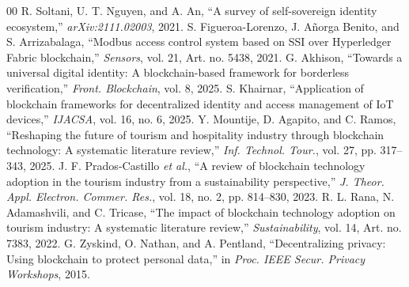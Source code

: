 \documentclass[conference]{IEEEtran}
\begin{document}
\begin{thebibliography}{00}
 R. Soltani, U. T. Nguyen, and A. An, ``A survey of self-sovereign identity ecosystem,'' \textit{arXiv:2111.02003}, 2021.
 S. Figueroa-Lorenzo, J. A\~norga Benito, and S. Arrizabalaga, ``Modbus access control system based on SSI over Hyperledger Fabric blockchain,'' \textit{Sensors}, vol. 21, Art. no. 5438, 2021.
 G. Akhison, ``Towards a universal digital identity: A blockchain-based framework for borderless verification,'' \textit{Front. Blockchain}, vol. 8, 2025.
 S. Khairnar, ``Application of blockchain frameworks for decentralized identity and access management of IoT devices,'' \textit{IJACSA}, vol. 16, no. 6, 2025.
 Y. Mountije, D. Agapito, and C. Ramos, ``Reshaping the future of tourism and hospitality industry through blockchain technology: A systematic literature review,'' \textit{Inf. Technol. Tour.}, vol. 27, pp. 317--343, 2025.
 J. F. Prados-Castillo \textit{et al.}, ``A review of blockchain technology adoption in the tourism industry from a sustainability perspective,'' \textit{J. Theor. Appl. Electron. Commer. Res.}, vol. 18, no. 2, pp. 814--830, 2023.
 R. L. Rana, N. Adamashvili, and C. Tricase, ``The impact of blockchain technology adoption on tourism industry: A systematic literature review,'' \textit{Sustainability}, vol. 14, Art. no. 7383, 2022.
 G. Zyskind, O. Nathan, and A. Pentland, ``Decentralizing privacy: Using blockchain to protect personal data,'' in \textit{Proc. IEEE Secur. Privacy Workshops}, 2015.
\end{thebibliography}
\end{document}
